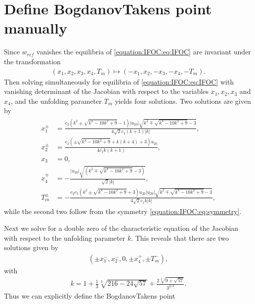 \documentclass[letterpaper,10pt,english]{jupyterBook}
\begin{document}
\begin{sphinxVerbatim}[commandchars=\\\{\}]
\end{sphinxVerbatim}


\section{Define Bogdanov\sphinxhyphen{}Takens point manually}
\label{\detokenize{IFOC:define-bogdanov-takens-point-manually}}
\sphinxAtStartPar
Since \(w_{ref}\) vanishes the equilibria of \eqref{equation:IFOC:eq:IFOC} are invariant under
the transformation
\begin{equation}\label{equation:IFOC:eq:symmetry}
\begin{split}(x_1, x_2, x_3, x_4, T_m) \mapsto (-x_1, x_2, -x_3, -x_4, -T_m).\end{split}
\end{equation}
\sphinxAtStartPar
Then solving simultaneously for equilibria of \eqref{equation:IFOC:eq:IFOC} with vanishing
determinant of the Jacobian with respect to the variables \(x_1, x_2, x_3\)
and \(x_4\), and the unfolding parameter \(T_m\) yields four solutions. Two solutions are
given by
\begin{equation*}
\begin{split}
\begin{aligned}
x_1^{\pm} &= \frac{c_2 \left(k^2 \pm \sqrt{k^4-10 k^2+9}-1\right)
|u_{20}|\sqrt{k^2 \mp \sqrt{k^4-10 k^2+9}-3}}{4 \sqrt{2} c_1 (k+1)|k|}, \\
x_2^{\pm} &= \frac{c_2 \left(\pm\sqrt{k^4-10 k^2+9}+k (k+4)+3\right) u_{20}}{4 c_1 k (k+1)}, \\
x_3 &= 0, \\
x_4^{\mp} &= -\frac{|u_{20}|\sqrt{\left(k^2\mp\sqrt{k^4-10 k^2+9}-3\right) }}{\sqrt{2}|k|}, \\
T_m^{\pm} &= -\frac{c_2 c_5 \left(k^2 \pm \sqrt{k^4-10 k^2+9}+3\right) u_{20} 
|u_{20}|\sqrt{k^2 \mp \sqrt{k^4-10 k^2+9}-3}}{4 \sqrt{2} c_1 k|k|},
\end{aligned}
\end{split}
\end{equation*}
\sphinxAtStartPar
while the second two follow from the symmetry \eqref{equation:IFOC:eq:symmetry}.

\sphinxAtStartPar
Next we solve for a double zero of the characteristic equation of the Jacobian
with respect to the unfolding parameter \(k\). This reveals that there are two
solutions given by
\begin{equation*}
\begin{split}
(\pm x_1^-, x_2^-, 0, \pm x_4^+, \pm T_m^-),
\end{split}
\end{equation*}
\sphinxAtStartPar
with
\begin{equation*}
\begin{split}
k = 1+\frac{1}{3} \sqrt[3]{216-24 \sqrt{57}}+\frac{2 \sqrt[3]{9+\sqrt{57}}}{3^{2/3}}.
\end{split}
\end{equation*}
\sphinxAtStartPar
Thus we can explicitly define the Bogdanov\sphinxhyphen{}Takens point
\end{document}
